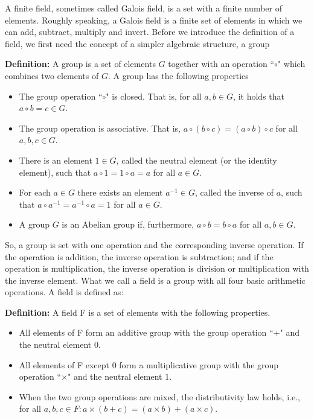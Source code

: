 A finite field, sometimes called Galois field, is a set with a finite number of elements. Roughly speaking, a Galois field is a finite set of elements in which we can add, subtract, multiply and invert. Before we introduce the definition of a field, we first need the concept of a simpler algebraic structure, a group

\vspace{0.25cm}\textbf{Definition:} A group is a set of elements $G$ together with an operation ``$\circ$" which combines two elements of $G$. A group has the following properties

\begin{itemize}
  \item The group operation ``$\circ$" is closed. That is, for all $a,b \in G$, it holds that $a \circ b = c \in G$.
  \item The group operation is associative. That is, $a \circ (b \circ c) = (a \circ b) \circ c$ for all $a, b, c \in G$.
  \item There is an element $1 \in G$, called the neutral element (or the identity element), such that $a \circ 1 = 1 \circ a = a$ for all $a \in G$.
  \item For each $a \in G$ there exists an element $a^{-1} \in G$, called the inverse of $a$, such that $a \circ a^{-1} = a^{-1} \circ a = 1$ for all $a \in G$.
  \item A group $G$ is an Abelian group if, furthermore, $a \circ b = b \circ a$ for all $a, b \in G$.
\end{itemize}

So, a group is set with one operation and the corresponding inverse operation. If the operation is addition, the inverse operation is subtraction; and if the operation is multiplication, the inverse operation is division or multiplication with the inverse element. What we call a field is a group with all four basic arithmetic operations. A field is defined as:

\vspace{0.25cm}\textbf{Definition:} A field F is a set of elements with the following properties.
\begin{itemize}
  \item All elements of F form an additive group with the group operation ``$+$" and the neutral element $0$.
  \item All elements of F except $0$ form a multiplicative group with the group operation ``$\times$" and the neutral element $1$.
  \item When the two group operations are mixed, the distributivity law holds, i.e., for all $a, b, c \in F: a \times (b+c) = (a \times b) + (a \times c)$.
\end{itemize}

